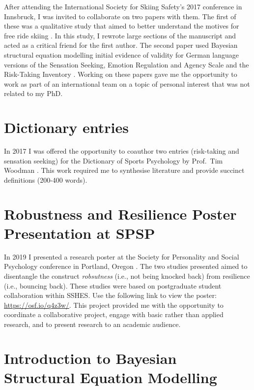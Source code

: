 \documentclass[
  12pt,
  a4paper,
]{book}
\begin{document}
After attending the International Society for Skiing Safety's 2017 conference in Innsbruck, I was invited to collaborate on two papers with them. The first of these was a qualitative study that aimed to better understand the motives for free ride skiing \citep{Fruhauf2017}. In this study, I rewrote large sections of the manuscript and acted as a critical friend for the first author. The second paper \citep{Fruhauf2018} used Bayesian structural equation modelling \citep[cf.~][]{Muthen2012} initial evidence of validity for German language versions of the Sensation Seeking, Emotion Regulation and Agency Scale \citep{Barlow2013} and the Risk-Taking Inventory \citep{Woodman2013}. Working on these papers gave me the opportunity to work as part of an international team on a topic of personal interest that was not related to my PhD.

\hypertarget{dictionary-entries}{%
\section{Dictionary entries}\label{dictionary-entries}}

In 2017 I was offered the opportunity to coauthor two entries (risk-taking and sensation seeking) for the Dictionary of Sports Psychology by Prof.~Tim Woodman \citep{Hardy2019, Hardy2019a}. This work required me to synthesise literature and provide succinct definitions (200-400 words).

\hypertarget{robustness-and-resilience-poster-presentation-at-spsp}{%
\section{Robustness and Resilience Poster Presentation at SPSP}\label{robustness-and-resilience-poster-presentation-at-spsp}}

In 2019 I presented a research poster at the Society for Personality and Social Psychology conference in Portland, Oregon \citep{Hardy2019c}. The two studies presented aimed to disentangle the construct \emph{robsutness} (i.e., not being knocked back) from resilience (i.e., bouncing back). These studies were based on postgraduate student collaboration within SSHES. Use the following link to view the poster: \url{https://osf.io/q4z3w/}. This project provided me with the opportunity to coordinate a collaborative project, engage with basic rather than applied research, and to present research to an academic audience.

\hypertarget{introduction-to-bayesian-structural-equation-modelling}{%
\section{Introduction to Bayesian Structural Equation Modelling}\label{introduction-to-bayesian-structural-equation-modelling}}
\end{document}
